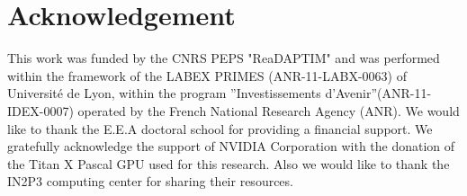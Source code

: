 \documentclass{article}
\begin{document}
\section{Acknowledgement}
This work was funded by the CNRS PEPS "ReaDAPTIM" and was performed within the framework of the LABEX PRIMES (ANR-11-LABX-0063) of Université de Lyon, within the program ”Investissements d’Avenir”(ANR-11-IDEX-0007) operated by the French National Research Agency (ANR). We would like to thank the E.E.A doctoral school for providing a financial support.
We gratefully acknowledge the support of NVIDIA Corporation with the donation of the Titan X Pascal GPU used for this research. Also we would like to thank the IN2P3 computing center for sharing their resources.

\end{document}
